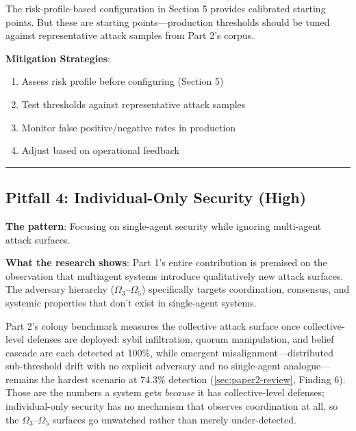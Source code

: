 \documentclass[
]{article}
\providecommand{\tightlist}{%
  \setlength{\itemsep}{0pt}\setlength{\parskip}{0pt}}
\begin{document}
The risk-profile-based configuration in Section 5 provides calibrated
starting points. But these are starting points---production thresholds
should be tuned against representative attack samples from Part 2's
corpus.

\textbf{Mitigation Strategies}:

\begin{enumerate}
\def\labelenumi{\arabic{enumi}.}
\tightlist
\item
  Assess risk profile before configuring (Section 5)
\item
  Test thresholds against representative attack samples
\item
  Monitor false positive/negative rates in production
\item
  Adjust based on operational feedback
\end{enumerate}

\begin{center}\rule{0.5\linewidth}{0.5pt}\end{center}

\subsection{Pitfall 4: Individual-Only Security
(High)}\label{pitfall-4-individual-only-security-high}

\textbf{The pattern}: Focusing on single-agent security while ignoring
multi-agent attack surfaces.

\textbf{What the research shows}: Part 1's entire contribution is
premised on the observation that multiagent systems introduce
qualitatively new attack surfaces. The adversary hierarchy
(\(\Omega_3\)--\(\Omega_5\)) specifically targets coordination,
consensus, and systemic properties that don't exist in single-agent
systems.

Part 2's colony benchmark measures the collective attack surface once
collective-level defenses are deployed: sybil infiltration, quorum
manipulation, and belief cascade are each detected at 100\%, while
emergent misalignment---distributed sub-threshold drift with no explicit
adversary and no single-agent analogue---remains the hardest scenario at
74.3\% detection (\cref{sec:paper2-review}, Finding 6). Those are the
numbers a system gets \emph{because} it has collective-level defenses;
individual-only security has no mechanism that observes coordination at
all, so the \(\Omega_3\)--\(\Omega_5\) surfaces go unwatched rather than
merely under-detected.
\end{document}
